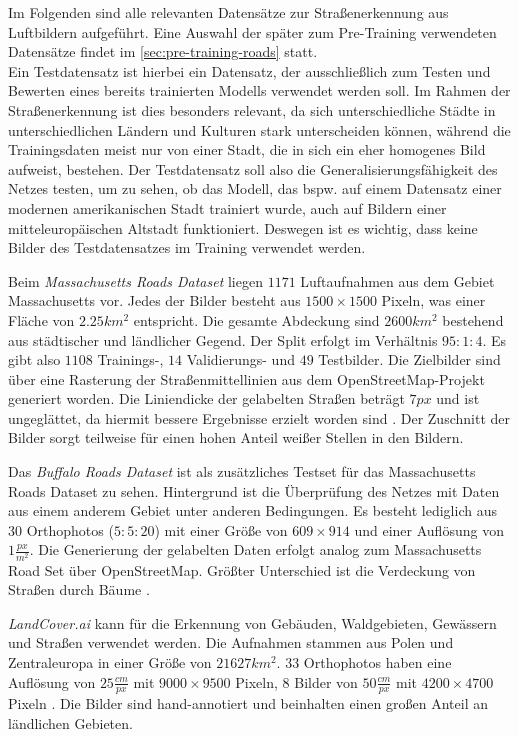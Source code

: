 Im Folgenden sind alle relevanten Datensätze zur Straßenerkennung aus Luftbildern aufgeführt. 
Eine Auswahl der später zum Pre-Training verwendeten Datensätze findet im \autoref{sec:pre-training-roads} statt.\\
Ein Testdatensatz ist hierbei ein Datensatz, der ausschließlich zum Testen und Bewerten eines bereits 
trainierten Modells verwendet werden soll. Im Rahmen der Straßenerkennung ist dies besonders relevant, 
da sich unterschiedliche Städte in unterschiedlichen Ländern und Kulturen stark unterscheiden können, 
während die Trainingsdaten meist nur von einer Stadt, die in sich ein eher homogenes Bild aufweist, bestehen.
Der Testdatensatz soll also die Generalisierungsfähigkeit des Netzes testen, um zu sehen,
ob das Modell, das bspw. auf einem Datensatz einer modernen amerikanischen Stadt trainiert wurde, 
auch auf Bildern einer mitteleuropäischen Altstadt funktioniert. Deswegen ist es wichtig, 
dass keine Bilder des Testdatensatzes im Training verwendet werden. 

Beim \textit{Massachusetts Roads Dataset} liegen $1171$ Luftaufnahmen aus dem Gebiet Massachusetts vor.
Jedes der Bilder besteht aus $1500\times 1500$ Pixeln, was einer Fläche von $2.25 km^2$ entspricht.
Die gesamte Abdeckung sind $2600 km^2$ bestehend aus städtischer und ländlicher Gegend.
Der Split erfolgt im Verhältnis $95:1:4$.
Es gibt also $1108$ Trainings-, $14$ Validierungs- und $49$ Testbilder.
Die Zielbilder sind über eine Rasterung der Straßenmittellinien aus dem OpenStreetMap-Projekt generiert worden.
Die Liniendicke der gelabelten Straßen beträgt $7 px$ und ist ungeglättet, da hiermit bessere Ergebnisse erzielt worden sind \cite[S.~85f]{.06.04.2014}.
Der Zuschnitt der Bilder sorgt teilweise für einen hohen Anteil weißer Stellen in den Bildern.

Das \textit{Buffalo Roads Dataset} ist als zusätzliches Testset für das Massachusetts Roads Dataset zu sehen.
Hintergrund ist die Überprüfung des Netzes mit Daten aus einem anderem Gebiet unter anderen Bedingungen.
Es besteht lediglich aus 30 Orthophotos ($5:5:20$) mit einer Größe von $609\times 914$ und einer Auflösung von $1 \frac{px}{m^2}$.
Die Generierung der gelabelten Daten erfolgt analog zum Massachusetts Road Set über OpenStreetMap.
Größter Unterschied ist die Verdeckung von Straßen durch Bäume \cite[86-88]{.06.04.2014}.

\textit{LandCover.ai} kann für die Erkennung von Gebäuden, Waldgebieten, Gewässern und Straßen verwendet werden.
Die Aufnahmen stammen aus Polen und Zentraleuropa in einer Größe von $21627 km^2$.
$33$ Orthophotos haben eine Auflösung von $25 \frac{cm}{px}$ mit $9000\times 9500$ Pixeln, $8$ Bilder von $50 \frac{cm}{px}$ mit $4200 \times 4700$ Pixeln \cite{.20.04.2022}.
Die Bilder sind hand-annotiert und beinhalten einen großen Anteil an ländlichen Gebieten.

